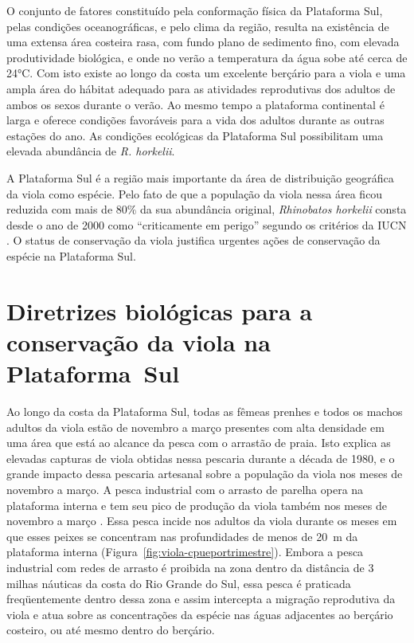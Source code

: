 \documentclass[a4paper,11pt,twoside,showtrims,onecolumn,openright,final]{memoir}
\begin{document}
O conjunto de fatores constituído pela conformação física da Plataforma Sul, pelas condições 
oceanográficas, e pelo clima da região, resulta na existência de uma extensa área 
costeira rasa, com fundo plano de sedimento fino, com elevada produtividade biológica, e onde 
no verão a temperatura da água sobe até cerca de 24°C. Com isto existe ao longo da costa um 
excelente berçário para a viola e uma ampla área do hábitat adequado para as atividades 
reprodutivas dos adultos de ambos os sexos durante o verão. Ao mesmo tempo a plataforma 
continental é larga e oferece condições favoráveis para a vida dos adultos durante as outras 
estações do ano. As condições ecológicas da Plataforma Sul  possibilitam uma elevada
abundância de \emph{R. horkelii}. 

A Plataforma Sul  é a região mais importante da área de distribuição geográfica da viola 
como espécie. Pelo fato de que a população da viola nessa área ficou reduzida com mais 
de 80\% da sua abundância original, \emph{Rhinobatos horkelii} consta desde o ano de 2000 
como ``criticamente em perigo'' segundo os critérios da IUCN \citep{lessa2000}. %
O status de conservação da viola justifica urgentes ações de conservação da espécie 
na Plataforma Sul. 

\section*{Diretrizes biológicas para a conservação da viola na \mbox{Plataforma Sul} }

Ao longo da costa da Plataforma Sul, todas as fêmeas prenhes e todos os machos adultos 
da viola estão de novembro a março presentes com alta densidade em uma área que está 
ao alcance da pesca com o arrastão de praia. Isto explica as elevadas capturas de viola 
obtidas nessa pescaria durante a década de 1980, e o grande impacto dessa pescaria artesanal 
sobre a população da viola nos meses de novembro a março. A pesca industrial com o arrasto 
de parelha opera na plataforma interna e tem seu pico de produção da viola também nos meses 
de novembro a março \citep{martins2003,miranda2003}. 
Essa pesca incide nos adultos da viola durante os meses em que esses peixes se concentram 
nas profundidades de menos de 20~m da plataforma interna (Figura~\ref{fig:viola-cpueportrimestre}). 
Embora a pesca industrial com redes de arrasto é proibida na zona dentro da distância 
de 3 milhas náuticas da costa do Rio Grande do Sul, essa pesca é praticada freqüentemente 
dentro dessa zona e assim intercepta a migração reprodutiva da viola e atua sobre as 
concentrações da espécie nas águas adjacentes ao berçário costeiro, ou até mesmo dentro 
do berçário. 
\end{document}
